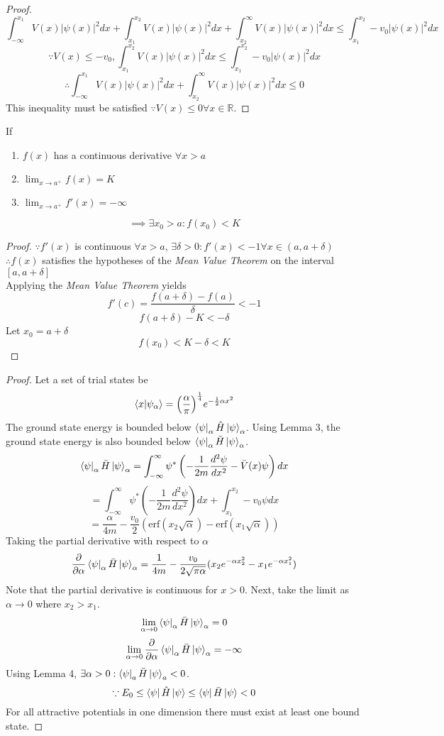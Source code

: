 \begin{sol}
\begin{proof}
$$\int_{-\infty}^{x_1} V(x)|\psi(x)|^2dx+\int_{x_1}^{x_2} V(x)|\psi(x)|^2dx+\int_{x_2}^\infty V(x)|\psi(x)|^2dx\leq \int_{x_1}^{x_2} -v_0|\psi(x)|^2dx$$ $$\because V(x)\leq -v_0, \int_{x_1}^{x_2} V(x)|\psi(x)|^2dx\leq \int_{x_1}^{x_2} -v_0|\psi(x)|^2dx$$
$$\therefore\int_{-\infty}^{x_1} V(x)|\psi(x)|^2dx+\int_{x_2}^\infty V(x)|\psi(x)|^2dx\leq 0$$
This inequality must be satisfied $\because V(x)\leq 0\forall x\in\mathbb{R}$. 
\end{proof}
\begin{lemma}
If 
\begin{enumerate}
\item $f(x)$ has a continuous derivative  $\forall x>a$
\item $\lim_{x\to a^+}f(x)=K$
\item $\lim_{x\to a^+}f'(x)=-\infty$
\end{enumerate}
$$\implies\exists x_0>a:f(x_0)<K$$
\end{lemma}
\begin{proof}
$\because f'(x)$ is continuous $\forall x>a$, $\exists\delta>0:f'(x)<-1\forall x\in(a,a+\delta)$\\
$\therefore f(x)$ satisfies the hypotheses of the \textit{Mean Value Theorem} on the interval $[a,a+\delta]$\\
Applying the \textit{Mean Value Theorem} yields
$$f'(c)=\frac{f(a+\delta)-f(a)}{\delta}<-1$$ $$f(a+\delta)-K<-\delta$$ Let $x_0=a+\delta$ 
$$f(x_0)<K-\delta<K$$
\end{proof}
\begin{proof}
Let a set of trial states be
$$\braket{x}{\psi_\alpha}=\Big(\frac{\alpha}{\pi}\Big)^\frac{1}{4}e^{-\frac{1}{2}\alpha x^2}$$
The ground state energy is bounded below $\bra\psi_\alpha\hat H\ket\psi_\alpha$. Using Lemma 3, the ground state energy is also bounded below $\bra\psi_\alpha\bar H\ket\psi_\alpha$.
$$\bra\psi_\alpha\bar H\ket\psi_\alpha=\int_{-\infty}^{\infty} \psi^*\left(-\frac{1}{2m}\frac{d^2\psi}{dx^2}-\bar V(x)\psi\right)dx$$
$$=\int_{-\infty}^\infty\psi^*\left(-\frac{1}{2m}\frac{d^2\psi}{dx^2}\right)dx+\int_{x_1}^{x_2}-v_0\psi dx$$ 
$$=\frac{\alpha}{4m}-\frac{v_0}{2}(\mathrm{erf}(x_2\sqrt{\alpha})-\mathrm{erf}(x_1\sqrt{\alpha}))$$ 
Taking the partial derivative with respect to $\alpha$ 
$$\frac{\partial}{\partial\alpha}\bra\psi_\alpha\bar H\ket\psi_\alpha=\frac{1}{4m}-\frac{v_0}{2\sqrt{\pi\alpha}}(x_2e^{-\alpha x_2^2}-x_1e^{-\alpha x_1^2})$$
Note that the partial derivative is continuous for $x>0$. Next, take the limit as $\alpha\to 0$ where $x_2>x_1$.
$$\lim_{\alpha\to 0}\bra\psi_\alpha\bar H\ket\psi_\alpha=0$$
$$\lim_{\alpha\to 0}\frac{\partial}{\partial\alpha}\bra\psi_\alpha\bar H\ket\psi_\alpha=-\infty$$ 
Using Lemma 4, $\exists\alpha>0: \bra\psi_a\bar H\ket\psi_a<0$.
$$\because E_0\leq\bra\psi\hat H\ket\psi\leq\bra\psi\bar H\ket\psi<0$$ 
For all attractive potentials in one dimension there must exist at least one bound state.
\end{proof}
\end{sol}